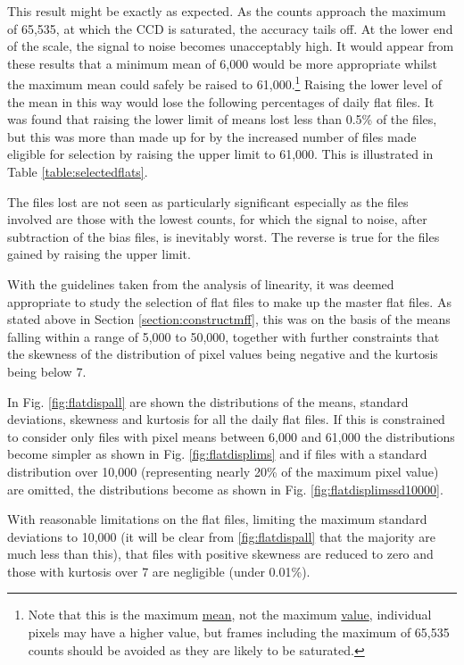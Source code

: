 This result might be exactly as expected. As the counts approach the maximum of
65,535, at which the CCD is saturated, the accuracy tails off. At the lower end
of the scale, the signal to noise becomes unacceptably high. It would appear
from these results that a minimum mean of 6,000 would be more appropriate whilst
the maximum mean could safely be raised to 61,000.\footnote{Note that this is
the maximum \underline{mean}, not the maximum \underline{value}, individual
pixels may have a higher value, but frames including the maximum of 65,535 counts should be avoided as
they are likely to be saturated.} Raising the lower level of the mean in this
way would lose the following percentages of daily flat files. It was found that
raising the lower limit of means lost less than 0.5\% of the files, but this was
more than made up for by the increased number of files made eligible for
selection by raising the upper limit to 61,000. This is illustrated in Table
\ref{table:selectedflats}.

The files lost are not seen as particularly significant especially as the files
involved are those with the lowest counts, for which the signal to noise, after
subtraction of the bias files, is inevitably worst. The reverse is true for the
files gained by raising the upper limit.

\protect\label{section:flatselection}

With the guidelines taken from the analysis of linearity, it was deemed
appropriate to study the selection of flat files to make up the master flat
files. As stated above in Section \ref{section:constructmff}, this was on the
basis of the means falling within a range of 5,000 to 50,000, together with
further constraints that the skewness of the distribution of pixel values being
negative and the kurtosis being below 7.

In Fig. \ref{fig:flatdispall} are shown the distributions of the means, standard
deviations, skewness and kurtosis for all the daily flat files. If this is
constrained to consider only files with pixel means between 6,000 and 61,000 the
distributions become simpler as shown in Fig. \ref{fig:flatdisplims} and if
files with a standard distribution over 10,000 (representing nearly 20\% of the
maximum pixel value) are omitted, the distributions become as shown in Fig.
\ref{fig:flatdisplimssd10000}.

With reasonable limitations on the flat files, limiting the maximum standard
deviations to 10,000 (it will be clear from \ref{fig:flatdispall} that the
majority are much less than this), that files with positive skewness are reduced
to zero and those with kurtosis over 7 are negligible (under 0.01\%).

